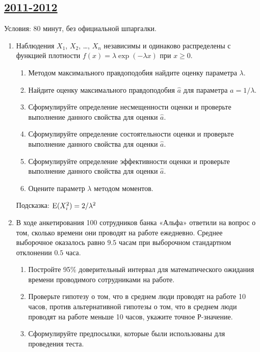 
\subsection[2011-2012]{\hyperref[sec:sol_kr_03_2011_2012]{2011-2012}}
\label{sec:kr_03_2011_2012}


Условия: 80 минут, без официальной шпаргалки.

\begin{enumerate}
\item Наблюдения $X_1$, $X_2$, \ldots, $X_n$ независимы и одинаково распределены с функцией плотности $f(x)=\lambda \exp(-\lambda x)$ при $x\geq 0$.
\begin{enumerate}
\item Методом максимального правдоподобия найдите оценку параметра  $\lambda$.
\item Найдите оценку максимального правдоподобия $\hat{a}$ для параметра $a=1/\lambda$.
\item Сформулируйте определение несмещенности оценки и проверьте выполнение данного свойства для оценки $\hat{a}$.
\item Сформулируйте определение состоятельности оценки и проверьте выполнение данного свойства для оценки $\hat{a}$.
\item Сформулируйте определение эффективности  оценки и проверьте выполнение данного свойства для оценки $\hat{a}$.
\item Оцените параметр $\lambda$ методом моментов.
\end{enumerate}
Подсказка: $\operatorname{E}(X_i^2)=2/\lambda^2$

\item В ходе анкетирования 100 сотрудников банка «Альфа» ответили на вопрос о том, сколько времени они проводят на работе ежедневно. Среднее выборочное оказалось равно $9.5$ часам при выборочном стандартном отклонении $0.5$ часа.
\begin{enumerate}
\item Постройте 95\% доверительный интервал для математического ожидания времени проводимого сотрудниками на работе.
\item Проверьте гипотезу о том, что в среднем люди проводят на работе 10 часов, против альтернативной гипотезы о том, что в среднем люди проводят на работе меньше 10 часов, укажите точное Р-значение.
\item Сформулируйте предпосылки, которые были использованы для проведения теста.
\end{enumerate}


\end{enumerate}
